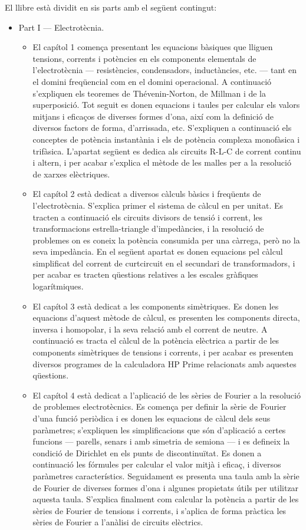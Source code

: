 	El llibre està dividit en sis parts amb el següent contingut:
	\begin{itemize}
		\item Part I --- Electrotècnia. 
		\begin{itemize}
			\item El capítol 1 comença presentant les equacions bàsiques que lliguen tensions, corrents i potències en els components elementals de l'electrotècnia --- resistències, condensadors, inductàncies, etc. --- tant en el domini freqüencial com en el domini operacional. A continuació s'expliquen els teoremes de Thévenin-Norton, de Millman i de la superposició. Tot seguit es donen equacions i taules per calcular els valors mitjans i eficaços de diverses formes d'ona, així com la definició de diversos factors de forma, d'arrissada, etc. S'expliquen a continuació els conceptes de potència instantània i els de potència complexa monofàsica i trifàsica. L'apartat següent es dedica  als circuits R-L-C de corrent continu i altern, i per acabar s'explica el mètode de les malles per a la resolució de xarxes elèctriques.
			\item El capítol 2 està dedicat a diversos càlculs bàsics i freqüents de l'electrotècnia. S'explica primer el sistema de càlcul en per unitat. Es tracten a continuació els circuits  divisors de tensió i corrent,  les transformacions estrella-triangle d'impedàncies, i la resolució de problemes on es coneix la potència consumida per una càrrega, però no la seva impedància. En el següent apartat es donen equacions pel càlcul simplificat del corrent de curtcircuit en el secundari de transformadors, i per acabar es tracten  qüestions relatives a les  escales gràfiques logarítmiques.
			\item El capítol 3 està dedicat a les components simètriques. Es donen les equacions d'aquest mètode de càlcul, es presenten les components directa, inversa i homopolar, i la seva relació amb el corrent de neutre. A continuació es tracta el càlcul de la potència elèctrica a partir de les components simètriques de tensions i corrents, i per acabar es presenten diversos programes de la calculadora \textsf{HP Prime} relacionats amb aquestes qüestions.
			\item El capítol 4 està dedicat a l'aplicació de les sèries de Fourier a la resolució de problemes electrotècnics. Es comença per definir la sèrie de Fourier d'una funció periòdica i es donen les equacions de càlcul dels seus paràmetres; s'expliquen  les simplificacions que són d'aplicació a certes funcions --- parells, senars i amb simetria de semiona --- i es defineix la condició de Dirichlet en els punts de discontinuïtat. Es donen a continuació les fórmules per calcular el valor mitjà i eficaç, i diversos paràmetres característics. Seguidament es presenta una taula amb la sèrie de Fourier de diverses formes d'ona i algunes propietats útils per utilitzar aquesta taula. S'explica finalment com calcular la potència a partir de les sèries de Fourier de tensions i corrents, i s'aplica de forma pràctica les sèries de Fourier a l'anàlisi de circuits elèctrics.

\end{itemize}
\end{itemize}
